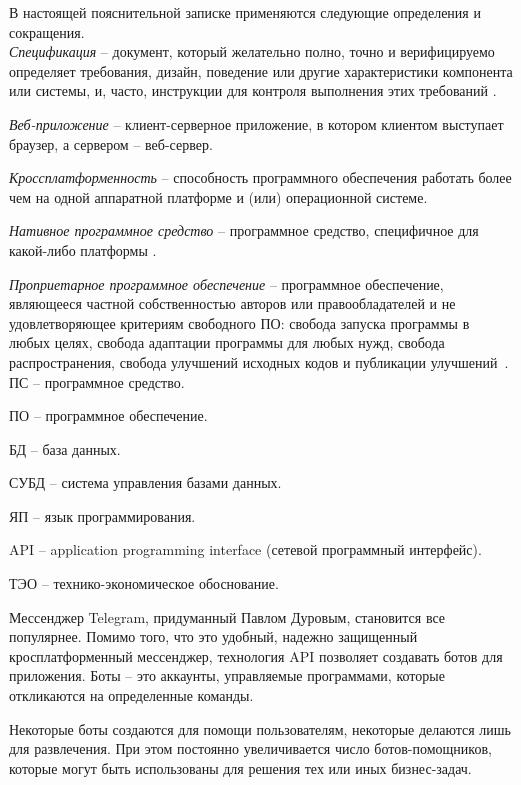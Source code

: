 \label{sec:definitions}

В настоящей пояснительной записке применяются следующие определения и сокращения.
\\

\emph{Спецификация} -- документ, который желательно полно, точно и верифицируемо определяет требования, дизайн, поведение или другие характеристики компонента или системы, и, часто, инструкции для контроля выполнения этих требований \cite{istqb_specification}.

\emph{Веб-приложение} -- клиент-серверное приложение, в котором клиентом выступает браузер, а сервером -- веб-сервер.

\emph{Кроссплатформенность} -- способность программного обеспечения работать более чем на одной аппаратной платформе и (или) операционной системе.

\emph{Нативное программное средство} -- программное средство, специфичное для какой-либо платформы \cite{habr_crossplatform}.

\emph{Проприетарное программное обеспечение} -- программное обеспечение, являющееся частной собственностью авторов или правообладателей и не удовлетворяющее критериям свободного ПО: свобода запуска программы в любых целях, свобода адаптации программы для любых нужд, свобода распространения, свобода улучшений исходных кодов и публикации улучшений~\cite{free_software}.
\\

ПС -- программное средство.

ПО -- программное обеспечение.

БД -- база данных.

СУБД -- система управления базами данных.

ЯП -- язык программирования.

API -- application programming interface (сетевой программный интерфейс).

ТЭО -- технико-экономическое обоснование.


\label{sec:introduction}


Мессенджер Telegram, придуманный Павлом Дуровым, становится все популярнее. Помимо того, что это удобный, надежно защищенный кросплатформенный мессенджер, технология API позволяет создавать ботов для приложения. Боты – это аккаунты, управляемые программами, которые откликаются на определенные команды.

Некоторые боты создаются для помощи пользователям, некоторые делаются лишь для развлечения. При этом постоянно увеличивается число ботов-помощников, которые могут быть использованы для решения тех или иных бизнес-задач.

